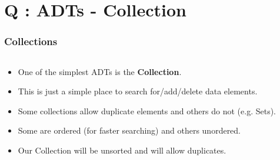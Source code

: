 \section{Q : ADTs - Collection}
\label{chap:adts_coll}


\begin{frame}[fragile]
\frametitle{Collections}
\begin{columns}[T]

\begin{column}{0.45\textwidth}
\begin{itemize}[<+->]
\item One of the simplest ADTs is the {\bf Collection}.
\item This is just a simple place to search for/add/delete data elements.
\item Some collections allow duplicate elements and others do not (e.g. Sets).
\item Some are ordered (for faster searching) and others unordered.
\item Our Collection will be unsorted and will allow duplicates.
\end{itemize}
\end{column}

\pause
\begin{column}{0.45\textwidth}

\end{column}

\end{columns}
\end{frame}


